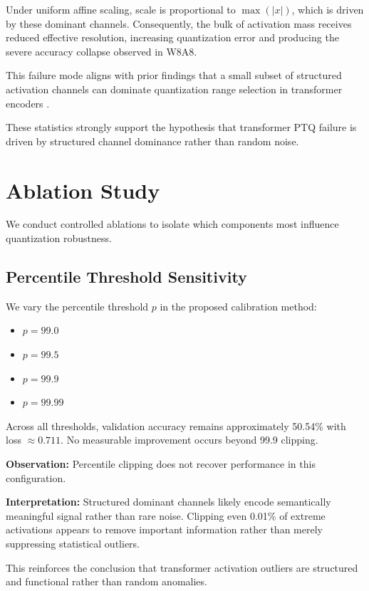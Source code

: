 \documentclass[conference]{IEEEtran}
\begin{document}
Under uniform affine scaling, scale is proportional to $\max(|x|)$, which is driven by these dominant channels. Consequently, the bulk of activation mass receives reduced effective resolution, increasing quantization error and producing the severe accuracy collapse observed in W8A8.

This failure mode aligns with prior findings that a small subset of structured activation channels can dominate quantization range selection in transformer encoders \cite{bondarenko2021understanding}.

These statistics strongly support the hypothesis that transformer PTQ failure is driven by structured channel dominance rather than random noise.

\section{Ablation Study}

We conduct controlled ablations to isolate which components most influence quantization robustness.

\subsection{Percentile Threshold Sensitivity}

We vary the percentile threshold $p$ in the proposed calibration method:

\begin{itemize}
\item $p = 99.0$
\item $p = 99.5$
\item $p = 99.9$
\item $p = 99.99$
\end{itemize}

Across all thresholds, validation accuracy remains approximately 50.54\% with loss $\approx 0.711$. No measurable improvement occurs beyond 99.9 clipping.

\textbf{Observation:} Percentile clipping does not recover performance in this configuration.

\textbf{Interpretation:} Structured dominant channels likely encode semantically meaningful signal rather than rare noise. Clipping even 0.01\% of extreme activations appears to remove important information rather than merely suppressing statistical outliers.

This reinforces the conclusion that transformer activation outliers are structured and functional rather than random anomalies.
\end{document}
